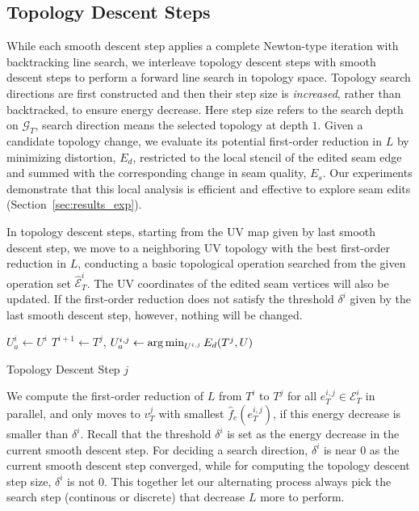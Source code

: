 
\subsection{Topology Descent Steps}
\label{sec:topologyStep}

While each smooth descent step applies a complete Newton-type iteration with backtracking line search, we interleave topology descent steps with smooth descent steps to perform a forward line search in topology space.  Topology search directions are first constructed and then their step size is \emph{increased}, rather than backtracked, to ensure energy decrease. Here step size refers to the search depth on $\mathcal{G}_T$, search direction means the selected topology at depth $1$. Given a candidate topology change, we evaluate its potential first-order reduction in $L$ by minimizing distortion, $E_d$, restricted to the local stencil of the edited seam edge and summed with the corresponding change in seam quality, $E_s$. Our experiments demonstrate that this local analysis is efficient and effective to explore seam edits (Section~\ref{sec:results_exp}).

In topology descent steps, starting from the UV map given by last smooth descent step, we move to a neighboring UV topology with the best first-order reduction in $L$, conducting a basic topological operation searched from the given operation set $\hat{\mathcal{E}}^i_T$. The UV coordinates of the edited seam vertices will also be updated. If the first-order reduction does not satisfy the threshold $\delta^i$ given by the last smooth descent step, however, nothing will be changed.

\begin{algorithm}[h]
\SetAlgoLined
{}
$U_a^{i} \leftarrow U^i$\;
{
  $T^{i+1} \leftarrow T^j$, $U_a^{i,j} \leftarrow \operatorname*{arg\,min}_{U^{i,j}} E_d(T^j,U)$\;
}
\caption{Topology Descent Step $j$}
\end{algorithm}
 
We compute the first-order reduction  of $L$ from $T^i$ to $T^j$ for all $e^{i,j}_T \in \mathcal{E}^i_T$ in parallel, and only moves to  $v^j_T$ with smallest $\hat{f}_e(e^{i,j}_{T})$, if this energy decrease is smaller than $\delta^i$. Recall that the threshold $\delta^i$ is set as the energy decrease in the current smooth descent step. For deciding a search direction, $\delta^i$ is near $0$ as the current smooth descent step converged, while for computing the topology descent step size, $\delta^i$ is not $0$. This together let our alternating process always pick the search step (continous or discrete) that decrease $L$ more to perform.

